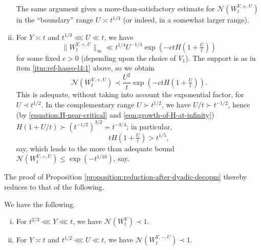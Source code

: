 \documentclass[reqno]{amsart} 
\begin{document}
\begin{enumerate}[(i)]
  The same argument gives a more-than-satisfactory estimate for $\mathcal{N} (W _t ^{Y, \pm, U})$ in the ``boundary'' range $U \asymp t ^{1/3}$ (or indeed, in a somewhat larger range).
\item For $Y \asymp t$ and $t ^{1/3} \lll U \ll t$, we have
  \begin{equation*}
    \lVert W _t ^{Y, +, U} \rVert_{\infty} \ll t ^{1/4} U ^{-1/4} \exp (- c t H (1 + \tfrac{U}{t}))
  \end{equation*}
  for some fixed $c > 0$ (depending upon the choice of $V_1$).  The support is as in item \eqref{itm:ref-haseo-l4:1} above, so we obtain
  \begin{equation*}
    \mathcal{N} (W _t ^{Y, +, U}) \prec\frac{U^2}{t} \exp (- c t H (1 + \tfrac{U}{t})).
  \end{equation*}
  This is adequate, without taking into account the exponential factor, for $U \prec t ^{1/2}$.  In the complementary range $U \succ t ^{1/2}$, we have $U / t \succ t ^{-1/2}$, hence (by \eqref{equation:H-near-critical} and \eqref{eqn:growth-of-H-at-infinity}) $H (1 + U/t) \succ (t^{-1/2})^{3/2} = t ^{- 3/4}$; in particular,
  \begin{equation*}
    t H (1 + \tfrac{U}{t}) > t^{1/5},
  \end{equation*}
  say, which leads to the more than adequate bound $\mathcal{N}(W_t^{Y,+,U}) \leq \exp(- t^{1/10})$, say.
\end{enumerate}
The proof of Proposition \ref{proposition:reduction-after-dyadic-decopm} thereby reduces to that of the following.

\begin{proposition}\label{proposition:reduction-to-critical-dyadic-ranges}
  We have the following.
  \begin{enumerate}[(i)]
  \item For $t ^{2/3} \lll Y \lll t$, we have $\mathcal{N} (W _{t} ^{Y}) \prec 1$.
  \item For $Y \asymp t$ and $t ^{1/2} \lll U \ll t$, we have $\mathcal{N} (W _{t} ^{Y, -, U}) \prec 1$.
  \end{enumerate}
\end{proposition}
\end{document}
